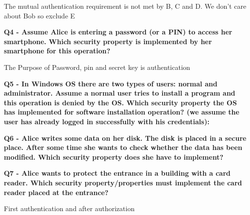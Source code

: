 \textcolor{Comment}{The mutual authentication requirement is not met by B, C and D. We don't care about Bob so exclude E}

\textbf{Q4 - Assume Alice is entering a password (or a PIN) to access her smartphone. Which security property is implemented by her smartphone for this operation?}

\textcolor{Comment}{The Purpose of Password, pin and secret key is authentication}

\textbf{Q5 - In Windows OS there are two types of users: normal and administrator. Assume a normal user tries to install a program and this operation is denied by the OS. Which security property the OS has implemented for software installation operation? (we assume the user has already logged in successfully with his credentials):}



\textbf{Q6 - Alice writes some data on her disk. The disk is placed in a secure place. After some time she wants to check whether the data has been modified. Which security property does she have to implement?}

\textbf{Q7 - Alice wants to protect the entrance in a building with a card reader. Which security property/properties must implement the card reader placed at the entrance?}
\textcolor{Comment}{First authentication and after authorization}

